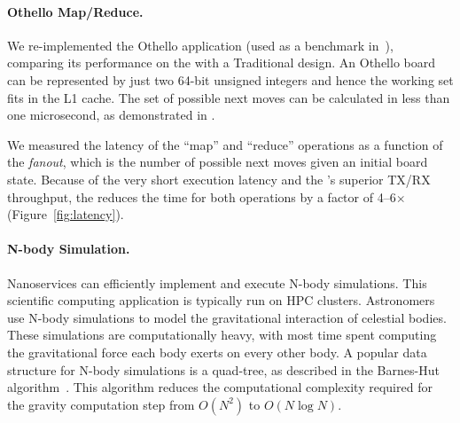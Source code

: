 
\paragraph{Othello Map/Reduce.} We re-implemented the Othello application (used as a benchmark in~\cite{lnic}), comparing its performance on the \name{} with a Traditional design.
An Othello board can be represented by just two 64-bit unsigned integers and hence the working set fits in the L1 cache. The set of possible next moves can be calculated in less than one microsecond, as demonstrated in \cite{lnic}.

We measured the latency of the ``map'' and ``reduce'' operations as a function of the {\em fanout}, which is the number of possible next moves given an initial board state.
Because of the very short execution latency and the \name{}'s superior TX/RX throughput, the \name{} reduces the time for both operations by a factor of 4--6$\times$ (Figure~\ref{fig:latency}).

%

\paragraph{N-body Simulation.} Nanoservices can efficiently implement and execute N-body simulations.
This scientific computing application is typically run on HPC clusters. 
Astronomers use N-body simulations to model the gravitational interaction of celestial bodies.
These simulations are computationally heavy, with most time spent computing the gravitational force each body exerts on every other body.
A popular data structure for N-body simulations is a quad-tree, as described in the Barnes-Hut algorithm~\cite{barnes-hut}. 
This algorithm reduces the computational complexity required for the gravity computation step from $O(N^2)$ to $O(N \log N)$.

